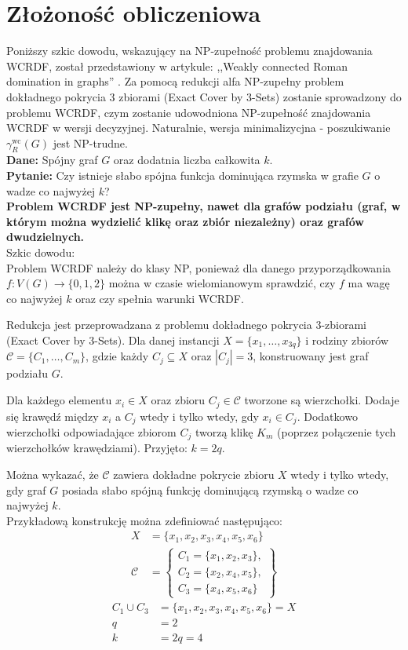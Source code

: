 \section{Złożoność obliczeniowa}
Poniższy szkic dowodu, wskazujący na NP-zupełność problemu znajdowania WCRDF, został przedstawiony w artykule: ,,Weakly connected Roman domination in graphs'' \cite{theoryWCRDF}. 
Za pomocą redukcji alfa NP-zupełny problem dokładnego pokrycia 3 zbiorami (Exact Cover by 3-Sets) \cite{X3C} zostanie sprowadzony do problemu WCRDF, czym zostanie udowodniona NP-zupełność znajdowania WCRDF w wersji decyzyjnej. Naturalnie, wersja minimalizycjna - poszukiwanie $\gamma_{R}^{\text{wc}}(G)$ jest NP-trudne.\\
\textbf{Dane:} Spójny graf $G$ oraz dodatnia liczba całkowita $k$.\\
\textbf{Pytanie:} Czy istnieje słabo spójna funkcja dominująca rzymska w grafie $G$ o wadze co najwyżej $k$?\\

\textbf{Problem WCRDF jest NP-zupełny, nawet dla grafów podziału (graf, w którym można wydzielić klikę oraz zbiór niezależny) oraz grafów dwudzielnych.}\\

Szkic dowodu:\\
Problem WCRDF należy do klasy NP, ponieważ dla danego przyporządkowania $f : V(G) \rightarrow \{0, 1, 2\}$ można w czasie wielomianowym sprawdzić, czy $f$ ma wagę co najwyżej $k$ oraz czy spełnia warunki WCRDF.

Redukcja jest przeprowadzana z problemu dokładnego pokrycia 3-zbiorami (Exact Cover by 3-Sets). Dla danej instancji $X = \{x_1, \dots, x_{3q}\}$ i rodziny zbiorów $\mathcal{C} = \{C_1, \dots, C_m\}$, gdzie każdy $C_j \subseteq X$ oraz $|C_j| = 3$, konstruowany jest graf podziału $G$.

Dla każdego elementu $x_i \in X$ oraz zbioru $C_j \in \mathcal{C}$ tworzone są wierzchołki. Dodaje się krawędź między $x_i$ a $C_j$ wtedy i tylko wtedy, gdy $x_i \in C_j$. Dodatkowo wierzchołki odpowiadające zbiorom $C_j$ tworzą klikę $K_m$ (poprzez połączenie tych wierzchołków krawędziami). Przyjęto: $k = 2q$.

Można wykazać, że $\mathcal{C}$ zawiera dokładne pokrycie zbioru $X$ wtedy i tylko wtedy, gdy graf $G$ posiada słabo spójną funkcję dominującą rzymską o wadze co najwyżej $k$.\\

Przykładową konstrukcję można zdefiniować następująco:
\begin{align*}
X &= \{x_1, x_2, x_3, x_4, x_5, x_6\} \\
\mathcal{C} &= \left\{
\begin{array}{l}
C_1 = \{x_1, x_2, x_3\}, \\
C_2 = \{x_2, x_4, x_5\}, \\
C_3 = \{x_4, x_5, x_6\}
\end{array}
\right\}
\end{align*}
\begin{align*}
C_1 \cup C_3 &= \{x_1, x_2, x_3, x_4, x_5, x_6\} = X \\
q &= 2 \\
k &= 2q = 4
\end{align*}

